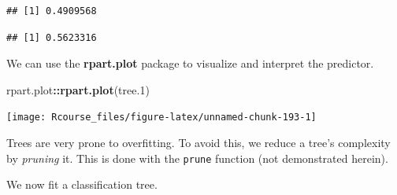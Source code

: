 \documentclass[]{book}
\newenvironment{Shaded}{\begin{snugshade}}{\end{snugshade}}
\newcommand{\KeywordTok}[1]{\textcolor[rgb]{0.13,0.29,0.53}{\textbf{#1}}}
\newcommand{\DataTypeTok}[1]{\textcolor[rgb]{0.13,0.29,0.53}{#1}}
\newcommand{\DecValTok}[1]{\textcolor[rgb]{0.00,0.00,0.81}{#1}}
\newcommand{\StringTok}[1]{\textcolor[rgb]{0.31,0.60,0.02}{#1}}
\newcommand{\CommentTok}[1]{\textcolor[rgb]{0.56,0.35,0.01}{\textit{#1}}}
\newcommand{\OperatorTok}[1]{\textcolor[rgb]{0.81,0.36,0.00}{\textbf{#1}}}
\newcommand{\NormalTok}[1]{#1}
\theoremstyle{definition}
\theoremstyle{definition}
\theoremstyle{definition}
\theoremstyle{remark}
\begin{document}
\begin{verbatim}
## [1] 0.4909568
\end{verbatim}

\begin{Shaded}
\end{Shaded}

\begin{verbatim}
## [1] 0.5623316
\end{verbatim}

We can use the \textbf{rpart.plot} package to visualize and interpret
the predictor.

\begin{Shaded}
\begin{Highlighting}[]
\NormalTok{rpart.plot}\OperatorTok{::}\KeywordTok{rpart.plot}\NormalTok{(tree.}\DecValTok{1}\NormalTok{)}
\end{Highlighting}
\end{Shaded}

\texttt{[image: Rcourse\_files/figure-latex/unnamed-chunk-193-1]}

Trees are very prone to overfitting. To avoid this, we reduce a tree's
complexity by \emph{pruning} it. This is done with the \texttt{prune}
function (not demonstrated herein).

We now fit a classification tree.

\begin{Shaded}
\end{Shaded}
\end{document}
